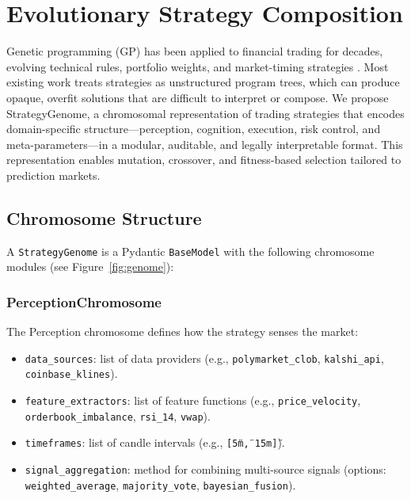 \section{Evolutionary Strategy Composition}\label{sec:evolution}

Genetic programming (GP) has been applied to financial trading for decades, evolving technical rules, portfolio weights, and market-timing strategies \citep{koza1992genetic, poli2008field, lopez2018advances}. Most existing work treats strategies as unstructured program trees, which can produce opaque, overfit solutions that are difficult to interpret or compose. We propose StrategyGenome, a chromosomal representation of trading strategies that encodes domain-specific structure---perception, cognition, execution, risk control, and meta-parameters---in a modular, auditable, and legally interpretable format. This representation enables mutation, crossover, and fitness-based selection tailored to prediction markets.

\subsection{Chromosome Structure}

A \texttt{StrategyGenome} is a Pydantic \texttt{BaseModel} with the following chromosome modules (see Figure~\ref{fig:genome}):

\subsubsection{PerceptionChromosome}

The Perception chromosome defines how the strategy senses the market:
\begin{itemize}
    \item \texttt{data\_sources}: list of data providers (e.g., \texttt{polymarket\_clob}, \texttt{kalshi\_api}, \texttt{coinbase\_klines}).
    \item \texttt{feature\_extractors}: list of feature functions (e.g., \texttt{price\_velocity}, \texttt{orderbook\_imbalance}, \texttt{rsi\_14}, \texttt{vwap}).
    \item \texttt{timeframes}: list of candle intervals (e.g., \texttt{[\"5m\", \"15m\"]}).
    \item \texttt{signal\_aggregation}: method for combining multi-source signals (options: \texttt{weighted\_average}, \texttt{majority\_vote}, \texttt{bayesian\_fusion}).
\end{itemize}

